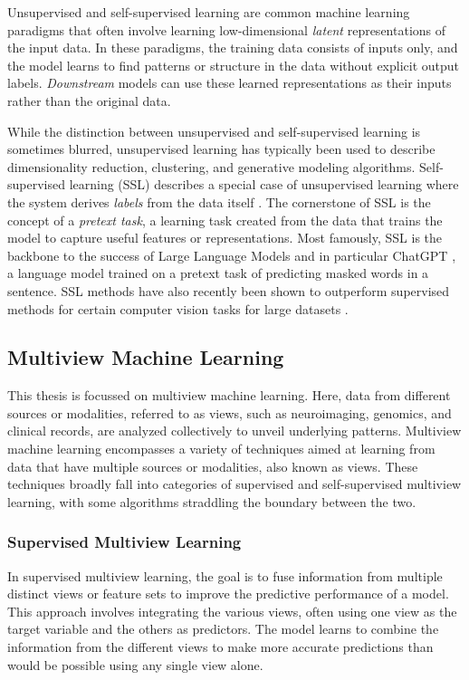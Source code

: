 Unsupervised and self-supervised learning are common machine learning paradigms that often involve learning low-dimensional \textit{latent} \gls{representations} of the input data. In these paradigms, the training data consists of inputs only, and the model learns to find patterns or structure in the data without explicit output labels. \textit{Downstream} models can use these learned \gls{representations} as their inputs rather than the original data.

While the distinction between unsupervised and self-supervised learning is sometimes blurred, unsupervised learning has typically been used to describe dimensionality reduction, clustering, and generative modeling algorithms. Self-supervised learning (SSL) describes a special case of unsupervised learning where the system derives \textit{labels} from the data itself \citep{balestriero2023cookbook}. The cornerstone of SSL is the concept of a \textit{pretext task}, a learning task created from the data that trains the model to capture useful features or representations. Most famously, SSL is the backbone to the success of Large Language Models \citep{vaswani2017attention} and in particular ChatGPT \citep{chatgpt}, a language model trained on a pretext task of predicting masked words in a sentence. SSL methods have also recently been shown to outperform supervised methods for certain computer vision tasks for large datasets \citep{goyal2019scaling}.


\subsection{Multiview Machine Learning}
This thesis is focussed on multiview machine learning.
Here, data from different sources or modalities, referred to as \gls{views}, such as neuroimaging, genomics, and clinical records, are analyzed collectively to unveil underlying patterns.
Multiview machine learning encompasses a variety of techniques aimed at learning from data that have multiple sources or modalities, also known as \gls{views}.
These techniques broadly fall into categories of supervised and self-supervised multiview learning, with some algorithms straddling the boundary between the two.

\subsubsection{Supervised Multiview Learning}

In supervised multiview learning, the goal is to fuse information from multiple distinct \gls{views} or feature sets to improve the predictive performance of a model. This approach involves integrating the various views, often using one view as the target variable and the others as predictors. The model learns to combine the information from the different \gls{views} to make more accurate predictions than would be possible using any single view alone.

